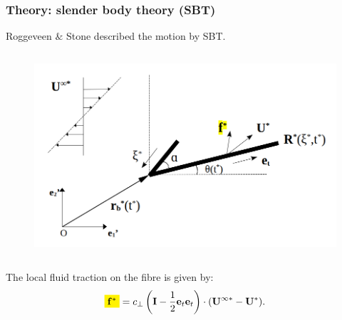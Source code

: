 \documentclass{beamer}
\begin{document}
\begin{frame}
	\frametitle{Theory: slender body theory (SBT)}
	\begin{overlayarea}{\textwidth}{\textheight}
		\vspace{-0.5cm}\small Roggeveen $\&$ Stone described the motion by SBT. \normalsize 
		\begin{columns}
			\begin{figure}[htb]
				\begin{center}
					\includegraphics[width=1\textwidth]{plots/schematic/schematic_rigid_configuration_color0.png}
				\end{center}
			\end{figure}
		\end{columns}\vspace{0.5cm}
		The local fluid traction on the fibre is given by: 
		\begin{equation*}
			\colorbox{yellow}{$\mathbf{f}^*$}=c_\perp\left(\mathbf{I}-\frac{1}{2}\mathbf{e}_t\mathbf{e}_t\right)\cdot(\mathbf{U}^{\infty*}-\mathbf{U}^*).
		\end{equation*}
	\end{overlayarea}
\end{frame}

\end{document}
